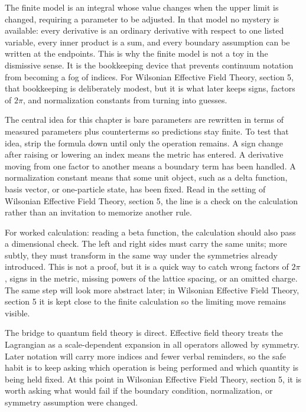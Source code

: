The finite model is an integral whose value changes when the upper limit is changed, requiring a parameter to be adjusted.  In that model no mystery is available: every derivative is an ordinary derivative with respect to one listed variable, every inner product is a sum, and every boundary assumption can be written at the endpoints.  This is why the finite model is not a toy in the dismissive sense.  It is the bookkeeping device that prevents continuum notation from becoming a fog of indices.  For Wilsonian Effective Field Theory, section 5, that bookkeeping is deliberately modest, but it is what later keeps signs, factors of \(2\pi\), and normalization constants from turning into guesses.

The central idea for this chapter is bare parameters are rewritten in terms of measured parameters plus counterterms so predictions stay finite.  To test that idea, strip the formula down until only the operation remains.  A sign change after raising or lowering an index means the metric has entered.  A derivative moving from one factor to another means a boundary term has been handled.  A normalization constant means that some unit object, such as a delta function, basis vector, or one-particle state, has been fixed.  Read in the setting of Wilsonian Effective Field Theory, section 5, the line is a check on the calculation rather than an invitation to memorize another rule.

For worked calculation: reading a beta function, the calculation should also pass a dimensional check.  The left and right sides must carry the same units; more subtly, they must transform in the same way under the symmetries already introduced.  This is not a proof, but it is a quick way to catch wrong factors of \(2\pi\), signs in the metric, missing powers of the lattice spacing, or an omitted charge.  The same step will look more abstract later; in Wilsonian Effective Field Theory, section 5 it is kept close to the finite calculation so the limiting move remains visible.

The bridge to quantum field theory is direct.  Effective field theory treats the Lagrangian as a scale-dependent expansion in all operators allowed by symmetry.  Later notation will carry more indices and fewer verbal reminders, so the safe habit is to keep asking which operation is being performed and which quantity is being held fixed.  At this point in Wilsonian Effective Field Theory, section 5, it is worth asking what would fail if the boundary condition, normalization, or symmetry assumption were changed.

